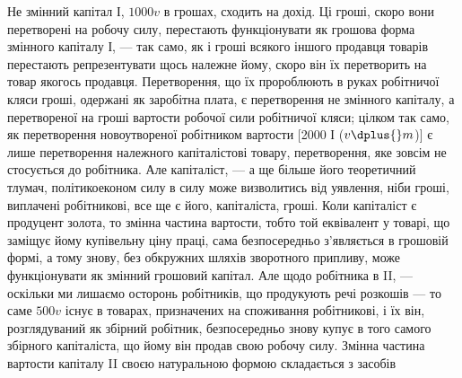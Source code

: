 Не змінний капітал І, $1000v$ в грошах, сходить на дохід. Ці гроші,
скоро вони перетворені на робочу силу, перестають функціонувати як
грошова форма змінного капіталу І, — так само, як і гроші всякого іншого
продавця товарів перестають репрезентувати щось належне йому,
скоро він їх перетворить на товар якогось продавця. Перетворення, що
їх пророблюють в руках робітничої кляси гроші, одержані як заробітна
плата, є перетворення не змінного капіталу, а перетвореної на гроші
вартости робочої сили робітничої кляси; цілком так само, як перетворення
новоутвореної робітником вартости [2000 І ($v \dplus{} m$)] є лише перетворення
належного капіталістові товару, перетворення, яке зовсім
не стосується до робітника. Але капіталіст, — а ще більше його теоретичний
тлумач, політикоеконом силу в силу може визволитись від уявлення,
ніби гроші, виплачені робітникові, все ще є його, капіталіста, гроші.
Коли капіталіст є продуцент золота, то змінна частина вартости, тобто
той еквівалент у товарі, що заміщує йому купівельну ціну праці, сама
безпосередньо з’являється в грошовій формі, а тому знову, без обкружних
шляхів зворотного припливу, може функціонувати як змінний грошовий
капітал. Але щодо робітника в II, — оскільки ми лишаємо осторонь
робітників, що продукують речі розкошів — то саме $500v$ існує в товарах,
призначених на споживання робітникові, і їх він, розглядуваний як
збірний робітник, безпосередньо знову купує в того самого збірного
капіталіста, що йому він продав свою робочу силу. Змінна частина
вартости капіталу II своєю натуральною формою складається з засобів
\parbreak{}  %
